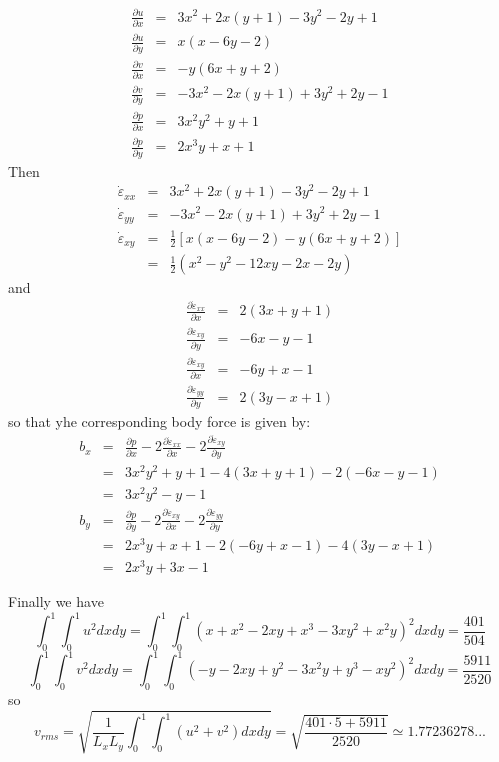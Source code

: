 \begin{eqnarray}
\frac{\partial u}{\partial x} &=& 3x^2+2x(y+1)-3y^2-2y+1   \\
\frac{\partial u}{\partial y} &=& x(x-6y-2)\\
\frac{\partial v}{\partial x} &=& -y(6x+y+2)\\
\frac{\partial v}{\partial y} &=& -3x^2-2x(y+1)+3y^2+2y-1 \\
\frac{\partial p}{\partial x} &=& 3x^2y^2 + y +1 \\ 
\frac{\partial p}{\partial y} &=& 2x^3y+x+1 
\end{eqnarray}
Then 
\begin{eqnarray}
\dot{\varepsilon}_{xx} &=&  3x^2+2x(y+1)-3y^2-2y+1 \\
\dot{\varepsilon}_{yy} &=& -3x^2-2x(y+1)+3y^2+2y-1 \\
\dot{\varepsilon}_{xy} &=&  \frac{1}{2} [x(x-6y-2) -y(6x+y+2) ] \\
&=& \frac{1}{2}( x^2 -y^2 -12xy -2x -2y)
\end{eqnarray}
and 
\begin{eqnarray}
\frac{\partial \dot{\varepsilon}_{xx}}{\partial x} &=& 2(3x+y+1) \\
\frac{\partial \dot{\varepsilon}_{xy}}{\partial y} &=& -6x-y-1  \\
\frac{\partial \dot{\varepsilon}_{xy}}{\partial x} &=&  -6y+x-1 \\  
\frac{\partial \dot{\varepsilon}_{yy}}{\partial y} &=& 2(3y-x+1) 
\end{eqnarray}
so that yhe corresponding body force is given by:
\begin{eqnarray}
b_x 
&=&  \frac{\partial p}{\partial x}  -  2\frac{\partial \dot{\varepsilon}_{xx}}{\partial x} -  2\frac{\partial \dot{\varepsilon}_{xy}}{\partial y} \\
&=& 3x^2y^2 + y +1  - 4(3x+y+1) - 2(-6x-y-1) \\
&=& 3x^2y^2 -y-1   \\
b_y 
&=& \frac{\partial p}{\partial y} -2 \frac{\partial \dot{\varepsilon}_{xy}}{\partial x} - 2\frac{\partial \dot{\varepsilon}_{yy}}{\partial y}  \\
&=& 2x^3y+x+1  -2(-6y+x-1) - 4(3y-x+1) \\
&=& 2x^3y+3x-1 
\end{eqnarray}

Finally we have
\[
\int_0^1 \int_0^1 u^2 dxdy=
\int_0^1 \int_0^1 ( x+x^2 - 2xy+x^3 - 3xy^2 + x^2y  )^2 dx dy = \frac{401}{504} 
\]
\[
\int_0^1 \int_0^1 v^2 dxdy=
\int_0^1 \int_0^1 (-y-2xy+y^2 -3x^2y + y^3 - xy^2  )^2 dx dy = \frac{5911}{2520}
\]
so 
\[
v_{rms} = \sqrt{ \frac{1}{L_x L_y}  \int_0^1 \int_0^1 (u^2+v^2) dx dy }  
= \sqrt{\frac{401\cdot 5 + 5911}{2520}}\simeq 1.77236278... 
\]





